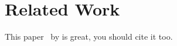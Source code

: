 \section{Related Work}
\label{relatedwork}

This paper~\cite{seeker2014measuring} by  is great, you should
cite it too.

